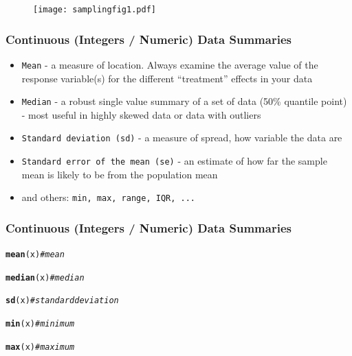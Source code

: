 \documentclass{beamer}\usepackage[]{graphicx}\usepackage[]{color}
\makeatletter
\newcommand{\hlcom}[1]{\textcolor[rgb]{0.678,0.584,0.686}{\textit{#1}}}%
\newcommand{\hlstd}[1]{\textcolor[rgb]{0.345,0.345,0.345}{#1}}%
\newcommand{\hlkwd}[1]{\textcolor[rgb]{0.737,0.353,0.396}{\textbf{#1}}}%
\newenvironment{kframe}{%
 \def\at@end@of@kframe{}%
 \ifinner\ifhmode%
  \def\at@end@of@kframe{\end{minipage}}%
  \begin{minipage}{\columnwidth}%
 \fi\fi%
 \def\FrameCommand##1{\hskip\@totalleftmargin \hskip-\fboxsep
 \colorbox{shadecolor}{##1}\hskip-\fboxsep
     \hskip-\linewidth \hskip-\@totalleftmargin \hskip\columnwidth}%
 \MakeFramed {\advance\hsize-\width
   \@totalleftmargin\z@ \linewidth\hsize
   \@setminipage}}%
 {\par\unskip\endMakeFramed%
 \at@end@of@kframe}
\newenvironment{knitrout}{}{} %
\makeatother
\begin{document}
{{{%

\begin{frame}[plain]
\begin{figure}
\texttt{[image: samplingfig1.pdf]}
\end{figure}
\end{frame}


\begin{frame}
\frametitle{Continuous (Integers / Numeric) Data Summaries}
 \begin{itemize}
\item {\tt Mean} - a measure of location. Always examine the average value of
the response variable(s) for the different ``treatment'' effects in your data
\item {\tt Median} - a robust single value summary of a set of data (50\% quantile
point) - most useful in highly skewed data or data with outliers
\item {\tt Standard deviation (sd)} - a measure of spread, how variable the data
are
\item {\tt Standard error of the mean (se)} - an estimate of how far the sample
mean is likely to be from the population mean
\item and others:  {\tt min, max, range, IQR, ...}
\end{itemize}
\end{frame}


\begin{frame}[fragile]
\frametitle{Continuous (Integers / Numeric) Data Summaries}
\begin{knitrout}
\color{fgcolor}\begin{kframe}
\begin{alltt}
\hlkwd{mean}\hlstd{(x)} \hlcom{# mean}

\hlkwd{median}\hlstd{(x)} \hlcom{# median}

\hlkwd{sd}\hlstd{(x)} \hlcom{# standard deviation}

\hlkwd{min}\hlstd{(x)} \hlcom{# minimum}

\hlkwd{max}\hlstd{(x)} \hlcom{# maximum}


\end{alltt}
\end{kframe}
\end{knitrout}
\end{frame}}}}
\end{document}
